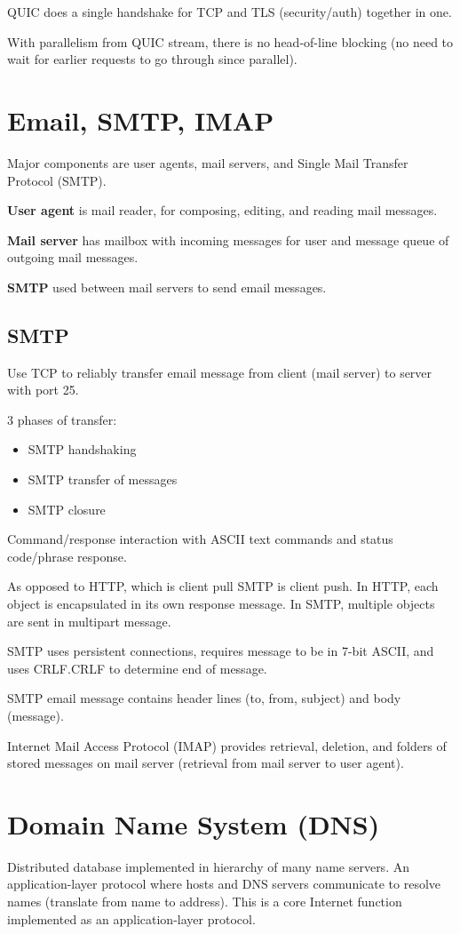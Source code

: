 \documentclass[11pt]{article}
\begin{document}
QUIC does a single handshake for TCP and TLS (security/auth) together in one.

With parallelism from QUIC stream, there is no head-of-line blocking (no need to wait for earlier
requests to go through since parallel).
\section{Email, SMTP, IMAP}
\label{sec:org8acc33a}
Major components are user agents, mail servers, and Single Mail Transfer Protocol (SMTP).

\textbf{User agent} is mail reader, for composing, editing, and reading mail messages.

\textbf{Mail server} has mailbox with incoming messages for user and message queue of outgoing mail
messages.

\textbf{SMTP} used between mail servers to send email messages.
\subsection{SMTP}
\label{sec:org96d4860}
Use TCP to reliably transfer email message from client (mail server) to server with port 25.

3 phases of transfer:
\begin{itemize}
\item SMTP handshaking
\item SMTP transfer of messages
\item SMTP closure
\end{itemize}

Command/response interaction with ASCII text commands and status code/phrase response.

As opposed to HTTP, which is client pull SMTP is client push.
In HTTP, each object is encapsulated in its own response message.
In SMTP, multiple objects are sent in multipart message.

SMTP uses persistent connections, requires message to be in 7-bit ASCII, and uses
CRLF.CRLF to determine end of message.

SMTP email message contains header lines (to, from, subject) and body (message).

Internet Mail Access Protocol (IMAP) provides retrieval, deletion, and folders of stored messages
on mail server (retrieval from mail server to user agent).
\section{Domain Name System (DNS)}
\label{sec:org1376803}
Distributed database implemented in hierarchy of many name servers.
An application-layer protocol where hosts and DNS servers communicate to resolve names (translate
from name to address). This is a core Internet function implemented as an application-layer protocol.
\end{document}
